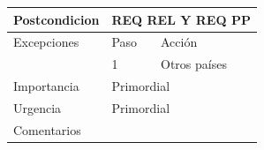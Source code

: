 \begin{table}[th!]
\begin{tabular}{|l|l|l|}
		Postcondicion                                                                & \multicolumn{2}{l|}{REQ REL Y REQ PP}                                                                                                                                                      \\ \hline
		Excepciones                                                                  & Paso                         & Acción                                                                                                                                                      \\ \hline
		& 1                            & Otros países                                                                                                                                                \\ \hline
		Importancia                                                                  & \multicolumn{2}{l|}{Primordial}                                                                                                                                                            \\ \hline
		Urgencia                                                                     & \multicolumn{2}{l|}{Primordial}                                                                                                                                                            \\ \hline
		Comentarios                                                                  & \multicolumn{2}{l|}{}                                                                                                                                                                      \\ \hline
	\end{tabular}
\end{table}

